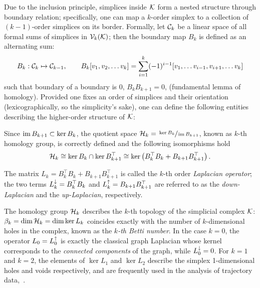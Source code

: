 Due to the inclusion principle, simplices inside \( \mathcal{K} \) form a nested structure through boundary relation; specifically, one can map a \( k \)-order simplex to a collection of \( (k-1)\)-order simplices on its border. Formally, let \( \mathcal{C}_k  \) be a linear space of all formal sums of simplices in \( \mathcal{V}_{k}(\mathcal{K}) \); then the boundary map \( B_k \) is defined as an alternating sum:
\begin{equation}
      B_k : \mathcal{C}_k \mapsto \mathcal{C}_{k-1}, \qquad B_k [ v_1, v_2, \ldots v_k ] = \sum_{i=1}^k (-1)^{i-1} [ v_1, \ldots v_{i-1}, v_{i+1}, \ldots v_k ] 
\end{equation}
such that boundary of a boundary is \( 0 \), \( B_k B_{k+1} = 0 \), (fundamental lemma of homology). Provided one fixes an order of simplices and their orientation (lexicographically, so the simplicity's sake), one can define the following entities describing the higher-order structure of \( \mathcal{K} \):
\begin{definition}
      Since \( \operatorname{im} B_{k+1} \subset \ker B_k \), the quotient space \( \mathcal{H}_k =  \sfrac{ \ker B_k }{ \operatorname{im} B_{k+1}} \), known as \( k\)-th homology group, is correctly defined and the following isomorphisms hold 
\begin{equation*}
            \mathcal{H}_k \cong \ker B_k \cap \ker B_{k+1}^\top \cong \ker \left( B_k^\top B_k + B_{k+1} B_{k+1}^\top \right).
      \end{equation*}

      The matrix \( L_k = B_k^\top B_k + B_{k+1} B_{k+1}^\top \) is called the \(k\)-th order \emph{Laplacian operator}; the two terms \( L_{k}^{\downarrow} =  B_k^\top B_k \) and \( L_{k}^{\uparrow} = B_{k+1} B_{k+1}^\top \) are referred to as the \emph{down-Laplacian} and the \emph{up-Laplacian}, respectively.
\end{definition}
The homology group \( \mathcal{H}_k \) describes the \(k\)-th topology of the simplicial complex \( \mathcal{K} \): \( \beta_k = \dim \mathcal{H}_k = \dim \ker L_k \)  coincides exactly with the number of \(k\)-dimensional holes in the complex, known as the \emph{ \(k\)-th Betti number}. In the case \( k = 0 \), the operator \( L_0 = L_{0}^{\uparrow}\) is exactly the classical graph Laplacian whose kernel corresponds to the \textit{connected components} of the graph, while \( L_{0}^{\downarrow}  = 0 \). For \( k = 1 \) and \( k = 2\), the elements of \( \ker L_1 \) and \( \ker L_2\) describe the simplex 1-dimensional holes and voids respectively, and are frequently used in the analysis of trajectory data,~\cite{schaub2019random,benson2016higher}. 

